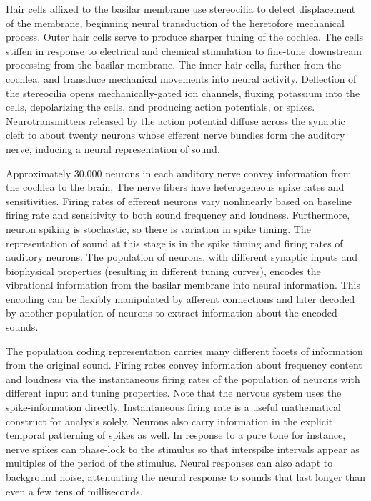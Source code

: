 \documentclass[11pt]{diazessay} %
\begin{document}
Hair cells affixed to the basilar membrane use stereocilia to detect displacement
of the membrane, beginning neural transduction
of the heretofore mechanical process.
Outer hair cells serve to produce sharper tuning of the cochlea.
The cells stiffen in response to electrical and chemical stimulation
to fine-tune downstream processing from the basilar membrane.
The inner hair cells, further from the cochlea,
and transduce mechanical movements into neural activity.
Deflection of the stereocilia opens mechanically-gated ion channels,
fluxing potassium into the cells, depolarizing the cells,
and producing action potentials, or spikes.
Neurotransmitters released by the action potential
diffuse across the synaptic cleft to about twenty neurons
whose efferent nerve bundles form the auditory nerve,
inducing a neural representation of sound.

Approximately 30,000 neurons in each auditory nerve
convey information from the cochlea to the brain,
The nerve fibers have heterogeneous spike rates and sensitivities.
Firing rates of efferent neurons vary nonlinearly
based on baseline firing rate
and sensitivity to both sound frequency and loudness.
Furthermore, neuron spiking is stochastic,
so there is variation in spike timing.
The representation of sound at this stage is in the
spike timing and firing rates of auditory neurons.
The population of neurons, with different synaptic inputs
and biophysical properties (resulting in different tuning curves),
encodes the vibrational information from the basilar membrane
into neural information.
This encoding can be flexibly manipulated by afferent connections
and later decoded by another population of neurons
to extract information about the encoded sounds.

The population coding representation carries many different
facets of information from the original sound.
Firing rates convey information about frequency content and loudness
via the instantaneous firing rates of the population of neurons
with different input and tuning properties.
Note that the nervous system uses the spike-information directly.
Instantaneous firing rate is a useful mathematical construct for analysis
solely.
Neurons also carry information in the explicit temporal patterning
of spikes as well.
In response to a pure tone for instance, nerve spikes can phase-lock
to the stimulus so that interspike intervals appear as multiples
of the period of the stimulus.
Neural responses can also adapt to background noise,
attenuating the neural response to sounds that last longer than
even a few tens of milliseconds. 
\end{document}
